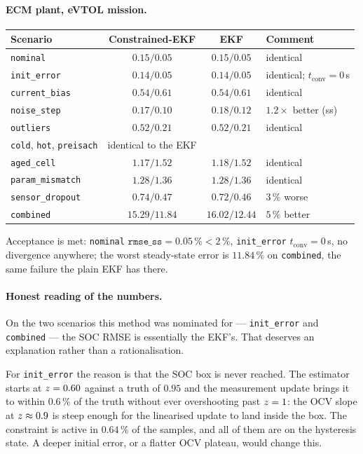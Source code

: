 \paragraph{ECM plant, eVTOL mission.}
\begin{center}\small
\begin{tabular}{@{}lccl@{}}
\toprule
Scenario & Constrained-EKF & EKF & Comment\\
\midrule
\texttt{nominal}        & $0.15/0.05$ & $0.15/0.05$ & identical\\
\texttt{init\_error}    & $0.14/0.05$ & $0.14/0.05$ & identical; $t_\mathrm{conv}=0$\,s\\
\texttt{current\_bias}  & $0.54/0.61$ & $0.54/0.61$ & identical\\
\texttt{noise\_step}    & $0.17/\mathbf{0.10}$ & $0.18/0.12$ & $1.2\times$ better (ss)\\
\texttt{outliers}       & $0.52/0.21$ & $0.52/0.21$ & identical\\
\texttt{cold}, \texttt{hot}, \texttt{preisach} & identical to the EKF & & \\
\texttt{aged\_cell}     & $1.17/1.52$ & $1.18/1.52$ & identical\\
\texttt{param\_mismatch}& $1.28/1.36$ & $1.28/1.36$ & identical\\
\texttt{sensor\_dropout}& $0.74/0.47$ & $0.72/0.46$ & $3\,\%$ worse\\
\texttt{combined}       & $\mathbf{15.29/11.84}$ & $16.02/12.44$ & $5\,\%$ better\\
\bottomrule
\end{tabular}
\end{center}
Acceptance is met: \texttt{nominal} $\texttt{rmse\_ss}=0.05\,\%<2\,\%$, \texttt{init\_error}
$t_\mathrm{conv}=0$\,s, no divergence anywhere; the worst steady-state error is $11.84\,\%$ on
\texttt{combined}, the same failure the plain EKF has there.

\paragraph{Honest reading of the numbers.}  On the two scenarios this method was nominated for ---
\texttt{init\_error} and \texttt{combined} --- the SOC RMSE is essentially the EKF's.  That deserves
an explanation rather than a rationalisation.

For \texttt{init\_error} the reason is that the SOC box is never reached.  The estimator starts at
$z=0.60$ against a truth of $0.95$ and the measurement update brings it to within $0.6\,\%$ of
the truth without ever overshooting past $z=1$: the OCV slope at $z\approx0.9$ is steep
enough for the linearised update to land inside the box.  The constraint is active in $0.64\,\%$ of
the samples, and all of them are on the hysteresis state.  A deeper initial error, or a flatter OCV
plateau, would change this.

